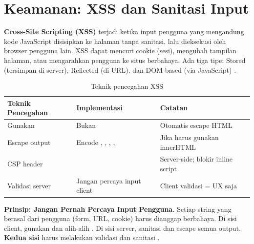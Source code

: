 \section{Keamanan: XSS dan Sanitasi Input}

\textbf{Cross-Site Scripting (XSS)} terjadi ketika input pengguna yang mengandung kode JavaScript disisipkan ke halaman tanpa sanitasi, lalu dieksekusi oleh browser pengguna lain. XSS dapat mencuri cookie (sesi), mengubah tampilan halaman, atau mengarahkan pengguna ke situs berbahaya. Ada tiga tipe: Stored (tersimpan di server), Reflected (di URL), dan DOM-based (via JavaScript) \cite{owaspXss}.

\begin{table}[htbp]
\centering
\begin{tabular}{|P{3cm}|P{4.5cm}|P{4.5cm}|}
\hline
\textbf{Teknik Pencegahan} & \textbf{Implementasi} & \textbf{Catatan} \\
\hline
Gunakan  & Bukan  & Otomatis escape HTML \\
\hline
Escape output & Encode \code{<}, \code{>}, \code{\&}, ,  & Jika harus gunakan innerHTML \\
\hline
CSP header &  & Server-side; blokir inline script \\
\hline
Validasi server & Jangan percaya input client & Client validasi = UX saja \\
\hline
\end{tabular}
\caption{Teknik pencegahan XSS}
\end{table}

\begin{catatan}
\textbf{Prinsip: Jangan Pernah Percaya Input Pengguna.} Setiap string yang berasal dari pengguna (form, URL, cookie) harus dianggap berbahaya. Di sisi client, gunakan  dan  alih-alih . Di sisi server, sanitasi dan escape semua output. \textbf{Kedua sisi} harus melakukan validasi dan sanitasi \cite{owaspXss}.
\end{catatan}


